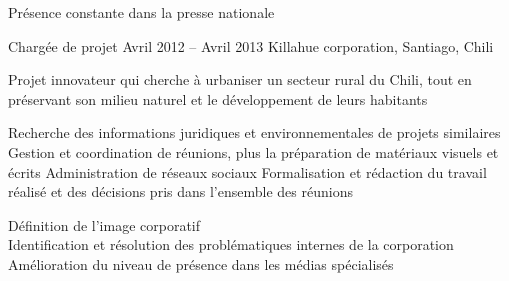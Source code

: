\begin{joblist}
{\begin{itemize}
		\end{itemize}       
		 Présence constante dans la presse nationale
	}




\item[Chargée de projet]{Avril 2012 -- Avril 2013 }     
	{Killahue corporation, Santiago, Chili}     
	{
		 Projet innovateur qui cherche à urbaniser un secteur rural du Chili, tout en préservant son milieu naturel et le développement de leurs habitants \\
			 
		\iftbftiny \setlength{\parskip}{-10pt} \fi
		\begin{itemize}
			  \iftbftiny \setlength\itemsep{-3pt} \fi
			  \cvitem[\checkmark] Recherche des informations juridiques et environnementales de projets similaires          
			  \cvitem[\checkmark] Gestion et coordination de réunions, plus la préparation de matériaux visuels et écrits   
			  \cvitem[\checkmark] Administration de réseaux sociaux                                                                    
			  \cvitem[\checkmark] Formalisation et rédaction du travail réalisé et des décisions pris dans l’ensemble des réunions     
		\end{itemize}      

		  Définition de l’image corporatif \\
		\mission{}            Identification et résolution des problématiques internes de la corporation \\
		\mission{} 	      Amélioration du niveau de présence dans les médias spécialisés \\
	}
  
       

   

\end{joblist}


%
%


